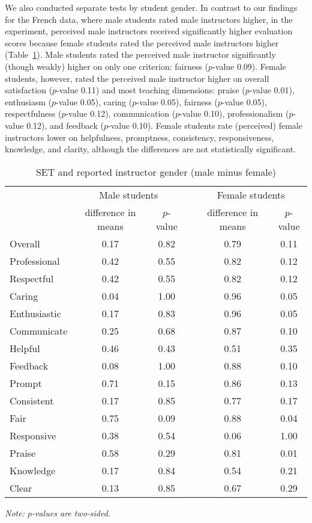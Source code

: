 \documentclass[12pt]{article}
\begin{document}
We also conducted separate tests by student gender.
In contrast to our findings for the French data, where male students 
rated male instructors higher, 
in the \citet{MacNell2014} experiment, perceived male instructors received 
significantly higher evaluation scores because female students rated the perceived 
male instructors higher (Table~\ref{tab:macnell2}). 
Male students rated the perceived male instructor significantly (though weakly) 
higher on only one criterion: fairness ($p$-value 0.09). 
Female students, however, rated the perceived male instructor higher on overall satisfaction 
($p$-value 0.11) and most teaching dimensions: 
praise ($p$-value 0.01), 
enthusiasm ($p$-value 0.05), 
caring ($p$-value 0.05), 
fairness ($p$-value 0.05), 
respectfulness ($p$-value 0.12),  
communication ($p$-value 0.10), 
professionalism ($p$-value 0.12), 
and feedback ($p$-value 0.10). 
Female students rate (perceived) female instructors lower on 
helpfulness, promptness, consistency, responsiveness, 
knowledge, and clarity, although the differences are not statistically significant.

\begin{table}[htbp]
  \centering
  \footnotesize 
  \caption{SET and reported instructor gender (male minus female)}
    \begin{tabular}{lccccc}
    \toprule 
          & \multicolumn{2}{c}{Male students}  &  & \multicolumn{2}{c}{Female students} \\
                          & difference in means  &  $p$-value &  & difference in means & $p$-value    \\
                          
   \midrule
    Overall &		0.17	& 0.82 & & 0.79    & 0.11   \\
    Professional &	0.42	& 0.55 & & 0.82    & 0.12   \\
    Respectful  & 	0.42	& 0.55 & & 0.82    & 0.12   \\
    Caring & 		0.04	& 1.00 & & 0.96    & 0.05  \\
    Enthusiastic &	0.17	& 0.83 & & 0.96    & 0.05   \\
    Communicate &	0.25	& 0.68 & & 0.87    & 0.10  \\
    Helpful &		0.46	& 0.43 & & 0.51    & 0.35   \\
    Feedback &		0.08	& 1.00 & & 0.88    & 0.10   \\
    Prompt &		0.71	& 0.15 & & 0.86    & 0.13   \\
    Consistent &		0.17	& 0.85 & & 0.77    & 0.17   \\
    Fair &			0.75	& 0.09 & & 0.88    & 0.04  \\
    Responsive & 	0.38	& 0.54 & & 0.06    & 1.00  \\
    Praise & 		0.58	& 0.29 & & 0.81    & 0.01  \\
    Knowledge &		0.17	& 0.84 & & 0.54    & 0.21  \\
    Clear &			0.13	& 0.85 & & 0.67    & 0.29  \\
    \bottomrule
    \end{tabular}%
 \label{tab:macnell2}%

  \textit{Note: $p$-values are two-sided.}
\end{table}%
\normalsize
\end{document}
